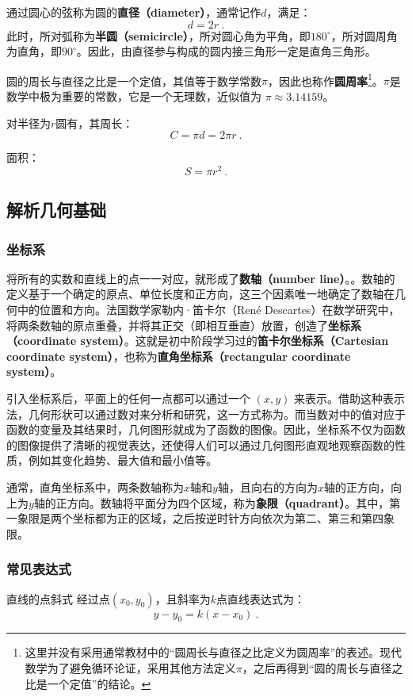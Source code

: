通过圆心的弦称为圆的\textbf{直径（diameter）}，通常记作$d$，满足：
\begin{equation}
d = 2r~.
\end{equation}
此时，所对弧称为\textbf{半圆（semicircle）}，所对圆心角为平角，即$180^\circ$，所对圆周角为直角，即$90^\circ$。因此，由直径参与构成的圆内接三角形一定是直角三角形。

圆的周长与直径之比是一个定值，其值等于数学常数$\pi$，因此也称作\textbf{圆周率}\footnote{这里并没有采用通常教材中的“圆周长与直径之比定义为圆周率”的表述。现代数学为了避免循环论证，采用其他方法定义$\pi$，之后再得到“圆的周长与直径之比是一个定值”的结论。}。$\pi$是数学中极为重要的常数，它是一个无理数，近似值为 $\pi \approx 3.14159$。

对半径为$r$圆有，其周长：
\begin{equation}
C = \pi d=2 \pi r~. 
\end{equation}

面积：
\begin{equation}
S = \pi r^2~.
\end{equation}


\subsection{解析几何基础}

\subsubsection{坐标系}
将所有的实数和直线上的点一一对应，就形成了\textbf{数轴（number line）}。。数轴的定义基于一个确定的原点、单位长度和正方向，这三个因素唯一地确定了数轴在几何中的位置和方向。法国数学家勒内·笛卡尔（René Descartes）在数学研究中，将两条数轴的原点重叠，并将其正交（即相互垂直）放置，创造了\textbf{坐标系（coordinate system）}。这就是初中阶段学习过的\textbf{笛卡尔坐标系（Cartesian coordinate system）}，也称为\textbf{直角坐标系（rectangular coordinate system）}。

引入坐标系后，平面上的任何一点都可以通过一个 $(x, y)$ 来表示。借助这种表示法，几何形状可以通过数对来分析和研究，这一方式称为。而当数对中的值对应于函数的变量及其结果时，几何图形就成为了函数的图像。因此，坐标系不仅为函数的图像提供了清晰的视觉表达，还使得人们可以通过几何图形直观地观察函数的性质，例如其变化趋势、最大值和最小值等。

通常，直角坐标系中，两条数轴称为$x$轴和$y$轴，且向右的方向为$x$轴的正方向，向上为$y$轴的正方向。数轴将平面分为四个区域，称为\textbf{象限（quadrant）}。其中，第一象限是两个坐标都为正的区域，之后按逆时针方向依次为第二、第三和第四象限。

\subsubsection{常见表达式}

\begin{definition}{直线的点斜式}\label{def_HsGeBa_1}
经过点$(x_0,y_0)$，且斜率为$k$点直线表达式为：
\begin{equation}
y-y_0=k(x-x_0)~.
\end{equation}
\end{definition}


